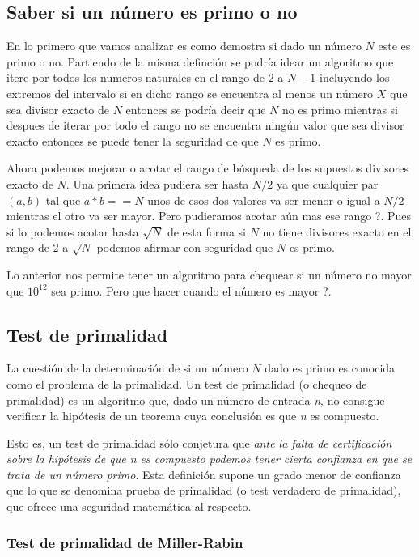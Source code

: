 \subsection{Saber si un número es primo o no}

En lo primero que vamos analizar es como demostra si dado un número $N$ este es primo o no. Partiendo de la misma definción se podría idear un algoritmo que itere por todos los numeros naturales en el rango de $2$ a $N-1$ incluyendo los extremos del intervalo si en dicho rango se encuentra al menos un número $X$ que sea divisor exacto de $N$ entonces se podría decir que $N$ no es primo mientras si despues de iterar por todo el rango no se encuentra ningún valor que sea divisor exacto entonces se puede tener la seguridad de que $N$ es primo.

Ahora podemos mejorar o acotar el rango de búsqueda de los supuestos divisores exacto de $N$. Una primera idea pudiera ser hasta $N/2$ ya que cualquier par $(a,b)$ tal que $a * b == N$ unos de esos dos valores va ser menor o igual a $N/2$ mientras el otro va ser mayor. Pero pudieramos acotar aún mas ese rango ?. Pues si lo podemos acotar hasta $\sqrt{N}$ de esta forma si $N$ no tiene divisores exacto en el rango de $2$ a $\sqrt{N}$ podemos afirmar con seguridad  que $N$ es primo.

 Lo anterior nos permite tener un algoritmo para chequear si un número no mayor que $10^{12}$ sea primo. Pero que hacer cuando el número es mayor ?.
 
\subsection{Test de primalidad}   

La cuestión de la determinación de si un número $N$ dado es primo es conocida como el problema de la primalidad. Un test de primalidad (o chequeo de primalidad) es un algoritmo que, dado un número de entrada {\em n}, no consigue verificar la hipótesis de un teorema cuya conclusión es que {\em n} es compuesto.

Esto es, un test de primalidad sólo conjetura que \emph{ante la falta de certificación sobre la hipótesis de que {\em n} es compuesto podemos tener cierta confianza en que se trata de un número primo}. Esta definición supone un grado menor de confianza que lo que se denomina prueba de primalidad (o test verdadero de primalidad), que ofrece una seguridad matemática al respecto.

\subsubsection{Test de primalidad de Miller-Rabin}


